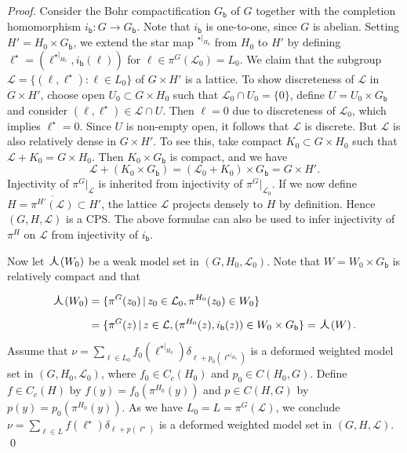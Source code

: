 \documentclass[11pt, a4wide]{amsart}
\newcommand{\oplam}{\mbox{\Large $\curlywedge$}}
\newcommand{\cL}{\mathcal L}
\numberwithin{lemma}{section}
\begin{document}
\begin{proof}
Consider the Bohr compactification $G_\mathsf{b}$ of $G$ together with the completion homomorphism $i_\mathsf{b}: G \to G_\mathsf{b}$. Note that $i_\mathsf{b}$ is one-to-one, since $G$ is abelian. Setting $H'=H_0\times G_\mathsf{b}$, we extend the star map ${}^{\star|_{H_0}}$ from $H_0$ to $H'$ by defining $\ell^\star=(\ell^{\star|_{H_0}},i_\mathsf{b}(\ell))$ for $\ell\in \pi^G(\mathcal L_0)=L_0$. We claim that the subgroup $\mathcal L=\{(\ell, \ell^\star): \ell\in L_0\}$ of $G\times H'$ is a lattice. To show discreteness of $\mathcal L$ in $G\times H'$, choose open $U_0\subset G\times H_0$ such that $\mathcal L_0\cap U_0=\{0\}$, define $U=U_0\times G_\mathsf{b}$ and consider $(\ell,\ell^\star)\in \mathcal L \cap U$. Then $\ell=0$ due to discreteness of $\mathcal L_0$, which implies $\ell^\star=0$. Since $U$ is non-empty open, it follows that $\mathcal L$ is discrete.
But $\mathcal L$ is also relatively dense in $G \times H'$. To see this, take compact $K_0 \subset G\times H_0$ such that $\mathcal L+K_0=G\times H_0$. Then $K_0\times G_\mathsf{b}$ is compact, and we have
%
\begin{displaymath}
\mathcal L+(K_0\times G_\mathsf{b}) = (\mathcal L_0+K_0)\times G_\mathsf{b}=G\times H'.
\end{displaymath}
%
Injectivity of $\pi^G|_{\mathcal L}$ is inherited from injectivity of $\pi^G|_{\mathcal L_0}$.
If we now define $H=\overline{\pi^{H'}(\mathcal L)}\subset H'$, the lattice $\mathcal L$ projects densely to $H$ by definition.  Hence $(G, H,\mathcal L)$ is a CPS. The above formulae can also be used to infer injectivity of $\pi^H$ on $\mathcal L$ from injectivity of $i_\mathsf{b}$.

Now let $\oplam(W_0)$ be a weak model set in $(G,H_0,\cL_0)$. Note that $W=W_0\times G_\mathsf{b}$ is relatively compact and that
%
\begin{displaymath}
\begin{split}
\oplam(W_0)&=\{ \pi^G(z_0) \,|\, z_0\in \mathcal L_0, \pi^{H_0}(z_0)\in W_0\}\\
&=\{ \pi^G(z) \,|\, z\in \mathcal L, (\pi^{H_0}(z),i_\mathsf{b}(z))\in W_0\times G_\mathsf{b}\}=\oplam(W) \,.
\end{split}
\end{displaymath}
%
Assume that $\nu=\sum_{\ell\in L_0}f_0(\ell^{\star|_{H_0}}) \delta_{\ell+p_0(\ell^{\star|_{H_0}})}$ is a deformed weighted model set in $(G, H_0,\mathcal L_0)$, where $f_0\in C_c(H_0)$ and $p_0\in C(H_0, G)$. Define $f\in C_c(H)$ by $f(y)=f_0(\pi^{H_0}(y))$ and $p\in C(H,G)$ by $p(y)=p_0(\pi^{H_0}(y))$. As we have $L_0=L=\pi^G(\mathcal L)$, we conclude $\nu=\sum_{\ell\in L}f(\ell^{\star}) \delta_{\ell+p(\ell^\star)}$ is a deformed weighted model set in $(G,H,\cL)$.
\qed
\end{proof}
\end{document}
